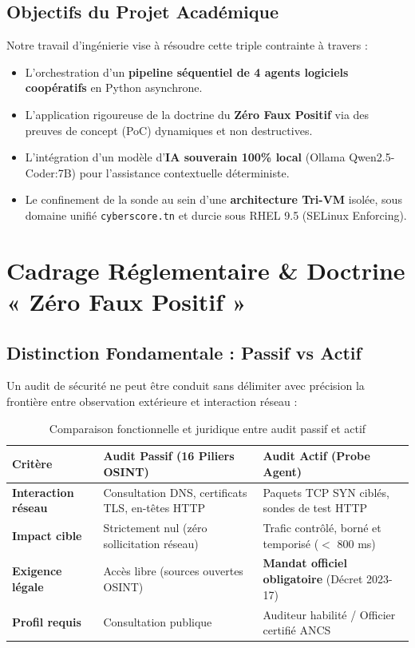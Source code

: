 \documentclass[11pt,a4paper,oneside]{article}
\begin{document}
\subsection{Objectifs du Projet Académique}
Notre travail d'ingénierie vise à résoudre cette triple contrainte à travers :
\begin{itemize}
    \item L'orchestration d'un \textbf{pipeline séquentiel de 4 agents logiciels coopératifs} en Python asynchrone.
    \item L'application rigoureuse de la doctrine du \textbf{Zéro Faux Positif} via des preuves de concept (PoC) dynamiques et non destructives.
    \item L'intégration d'un modèle d'\textbf{IA souverain 100\% local} (Ollama Qwen2.5-Coder:7B) pour l'assistance contextuelle déterministe.
    \item Le confinement de la sonde au sein d'une \textbf{architecture Tri-VM} isolée, sous domaine unifié \texttt{cyberscore.tn} et durcie sous RHEL 9.5 (SELinux Enforcing).
\end{itemize}

\section{Cadrage Réglementaire \& Doctrine « Zéro Faux Positif »}

\subsection{Distinction Fondamentale : Passif vs Actif}
Un audit de sécurité ne peut être conduit sans délimiter avec précision la frontière entre observation extérieure et interaction réseau :

\begin{table}[htbp]
\centering
\small
\renewcommand{\arraystretch}{1.1}
\begin{tabularx}{\textwidth}{lXX}
\toprule
\textbf{Critère} & \textbf{Audit Passif (16 Piliers OSINT)} & \textbf{Audit Actif (Probe Agent)} \\
\midrule
\textbf{Interaction réseau} & Consultation DNS, certificats TLS, en-têtes HTTP & Paquets TCP SYN ciblés, sondes de test HTTP \\
\textbf{Impact cible} & Strictement nul (zéro sollicitation réseau) & Trafic contrôlé, borné et temporisé ($<$ 800 ms) \\
\textbf{Exigence légale} & Accès libre (sources ouvertes OSINT) & \textbf{Mandat officiel obligatoire} (Décret 2023-17) \\
\textbf{Profil requis} & Consultation publique & Auditeur habilité / Officier certifié ANCS \\
\bottomrule
\end{tabularx}
\caption{Comparaison fonctionnelle et juridique entre audit passif et actif}
\end{table}
\end{document}
